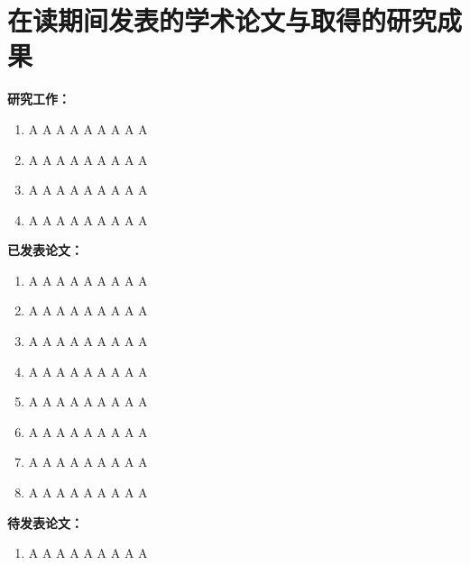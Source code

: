 ﻿
\chapter{在读期间发表的学术论文与取得的研究成果}

\noindent\textbf{研究工作：}

\begin{enumerate}

\item A A A A A A A A A
\item A A A A A A A A A
\item A A A A A A A A A
\item A A A A A A A A A

\end{enumerate}


\noindent\textbf{已发表论文：}

\begin{enumerate}

\item A A A A A A A A A 
\item A A A A A A A A A
\item A A A A A A A A A
\item A A A A A A A A A
\item A A A A A A A A A
\item A A A A A A A A A
\item A A A A A A A A A
\item A A A A A A A A A

\end{enumerate}

\vskip 1cm

\noindent\textbf{待发表论文：}

\begin{enumerate}

\item A A A A A A A A A

\end{enumerate} 
